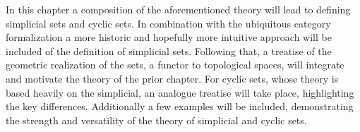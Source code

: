 \documentclass[../../main.tex]{subfiles}
\begin{document}
    In this chapter a composition of the aforementioned theory will lead to defining simplicial sets and cyclic sets. In combination with the ubiquitous category formalization a more historic and hopefully more intuitive approach will be included of the definition of simplicial sets. Following that, a treatise of the geometric realization of the sets, a functor to topological spaces, will integrate and motivate the theory of the prior chapter. For cyclic sets, whose theory is based heavily on the simplicial, an analogue treatise will take place, highlighting the key differences. Additionally a few examples will be included, demonstrating the strength and versatility of the theory of simplicial and cyclic sets.
\end{document}
